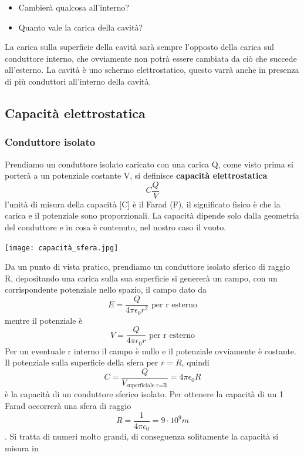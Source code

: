 \documentclass[a4paper, 12pt]{book}
\theoremstyle{plain}
\begin{document}
\begin{itemize}
    \item Cambierà qualcosa all'interno?
    \item Quanto vale la carica della cavità? 
\end{itemize}

La carica sulla superficie della cavità sarà sempre l'opposto
della carica sul conduttore interno, che ovviamente non 
potrà essere cambiata da ciò che succede all'esterno. La
cavità è uno schermo elettrostatico, questo varrà 
anche in presenza di più conduttori all'interno della 
cavità.

\subsection{Capacità elettrostatica}
\subsubsection{Conduttore isolato}

Prendiamo un conduttore isolato caricato con una carica Q,
come visto prima si porterà a un potenziale costante 
V, si definisce \textbf{capacità elettrostatica} \[ C
\frac{Q}{V} \] l'unità di misura della capacità [C] è il 
Farad (F), il significato fisico è che la carica e il 
potenziale sono proporzionali. La capacità dipende solo dalla
geometria del conduttore e in cosa è contenuto, nel nostro caso 
il vuoto.

\begin{center}
    \texttt{[image: capacità\_sfera.jpg]}
\end{center}

Da un punto di vista pratico, prendiamo un conduttore isolato 
sferico di raggio R, depositando una carica sulla sua
superficie si genererà un campo, con un corrispondente potenziale 
nello spazio, il campo dato da \[ E = \frac{Q}{4\pi \epsilon_0 r^2} \textrm{ per r esterno} \] 
mentre il potenziale è \[ V = \frac{Q}{4\pi \epsilon_0 r} \textrm{ per r esterno} \]
Per un eventuale r interno il campo è nullo e il potenziale ovviamente 
è costante. Il potenziale sulla superficie della sfera 
per $r = R$, quindi  \[ C = \frac{Q}{V_{\textrm{superficiale r=R}}} = 4\pi \epsilon_0 R \]
è la capacità di un conduttore sferico isolato. Per ottenere
la capacità di un 1 Farad occorrerà una sfera di raggio
 \[ R = \frac{1}{4\pi \epsilon_0 } = 9\cdot 10^9m \] . Si tratta 
di numeri molto grandi, di conseguenza solitamente la capacità si misura in 
\end{document}
